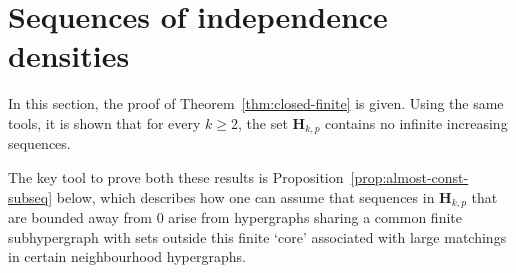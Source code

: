 \documentclass[11pt,reqno]{amsart}
\theoremstyle{definition}
\begin{document}
\section{Sequences of independence densities}\label{sec:results}

In this section, the proof of Theorem~\ref{thm:closed-finite} is given. Using the same tools, it is shown that for every $k \geq 2$, the set $\mathbf{H}_{k,p}$ contains no infinite increasing sequences.

The key tool to prove both these results is Proposition~\ref{prop:almost-const-subseq} below, which describes how one can assume that sequences in $\mathbf{H}_{k,p}$ that are bounded away from $0$ arise from hypergraphs sharing a common finite subhypergraph with sets outside this finite `core' associated with large matchings in certain neighbourhood hypergraphs.
\end{document}
